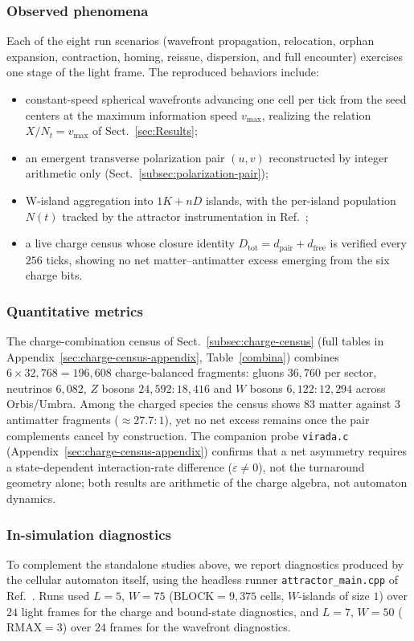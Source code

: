 \documentclass{ijuc}
\begin{document}
\subsubsection{Observed phenomena}
Each of the eight run scenarios (wavefront propagation, relocation, orphan expansion, contraction, homing, reissue, dispersion, and full encounter) exercises one stage of the light frame.  The reproduced behaviors include:
\begin{itemize}
\item constant-speed spherical wavefronts advancing one cell per tick from the seed centers at the maximum information speed $v_{\max}$, realizing the relation $X/N_t=v_{\max}$ of Sect.~\ref{sec:Results};
\item an emergent transverse polarization pair $(u,v)$ reconstructed by integer arithmetic only (Sect.~\ref{subsec:polarization-pair});
\item W-island aggregation into $1K+nD$ islands, with the per-island population $N(t)$ tracked by the attractor instrumentation in Ref.~\cite{af_neto};
\item a live charge census whose closure identity $D_{\mathrm{tot}}=d_{\mathrm{pair}}+d_{\mathrm{free}}$ is verified every $256$ ticks, showing no net matter--antimatter excess emerging from the six charge bits.
\end{itemize}
\subsubsection{Quantitative metrics}
The charge-combination census of Sect.~\ref{subsec:charge-census} (full tables in Appendix~\ref{sec:charge-census-appendix}, Table~\ref{combina}) combines $6\times32{,}768=196{,}608$ charge-balanced fragments: gluons $36{,}760$ per sector, neutrinos $6{,}082$, $Z$ bosons $24{,}592{:}18{,}416$ and $W$ bosons $6{,}122{:}12{,}294$ across Orbis/Umbra.  Among the charged species the census shows $83$ matter against $3$ antimatter fragments ($\approx27.7{:}1$), yet no net excess remains once the pair complements cancel by construction.  The companion probe \texttt{virada.c} (Appendix~\ref{sec:charge-census-appendix}) confirms that a net asymmetry requires a state-dependent interaction-rate difference ($\varepsilon \neq 0$), not the turnaround geometry alone; both results are arithmetic of the charge algebra, not automaton dynamics.
\subsubsection{In-simulation diagnostics}
To complement the standalone studies above, we report diagnostics produced by the cellular automaton itself, using the headless runner \texttt{attractor\_main.cpp} of Ref.~\cite{af_neto}.  Runs used $L=5$, $W=75$ ($\mathrm{BLOCK}=9{,}375$ cells, $W$-islands of size $1$) over $24$ light frames for the charge and bound-state diagnostics, and $L=7$, $W=50$ ($\mathrm{RMAX}=3$) over $24$ frames for the wavefront diagnostics.
\end{document}
